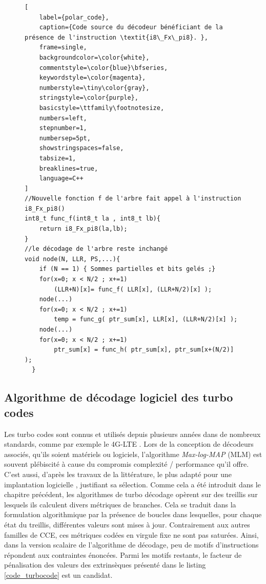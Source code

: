 \documentclass[../main.tex]{subfiles}
\begin{document}
\begin{figure}[!tb]
\begin{lstlisting}[
    label={polar_code},
    caption={Code source du décodeur bénéficiant de la présence de l'instruction \textit{i8\_Fx\_pi8}. },
    frame=single,
    backgroundcolor=\color{white},  
    commentstyle=\color{blue}\bfseries,
    keywordstyle=\color{magenta},
    numberstyle=\tiny\color{gray},
    stringstyle=\color{purple},
    basicstyle=\ttfamily\footnotesize,
    numbers=left,
    stepnumber=1,
    numbersep=5pt,                 
    showstringspaces=false,
    tabsize=1,
    breaklines=true,
    language=C++
]
//Nouvelle fonction f de l'arbre fait appel à l'instruction i8_Fx_pi8()
int8_t func_f(int8_t la , int8_t lb){
    return i8_Fx_pi8(la,lb);
}
//le décodage de l'arbre reste inchangé
void node(N, LLR, PS,...){
    if (N == 1) { Sommes partielles et bits gelés ;}
    for(x=0; x < N/2 ; x+=1)
        (LLR+N)[x]= func_f( LLR[x], (LLR+N/2)[x] );
    node(...)
    for(x=0; x < N/2 ; x+=1)
        temp = func_g( ptr_sum[x], LLR[x], (LLR+N/2)[x] );
    node(...)
    for(x=0; x < N/2 ; x+=1)
        ptr_sum[x] = func_h( ptr_sum[x], ptr_sum[x+(N/2)] );
  }
\end{lstlisting}
\end{figure}

%
%
%
%
%
%
%
%
\subsection{Algorithme de décodage logiciel des turbo codes}
%
%
%
%
Les turbo codes \cite{Berrou93,Wei18} sont connus et utilisés depuis plusieurs années dans de nombreux standards, comme par exemple le 4G-LTE \cite{Ref_4G}. Lors de la conception de décodeurs associés, qu'ils soient matériels ou logiciels, l'algorithme \textit{Max-log-MAP} (MLM) est souvent plébiscité à cause du compromis complexité / performance qu'il offre. C'est aussi, d'après les travaux de la littérature, le plus adapté pour une implantation logicielle \cite{ri:LeG19c}, justifiant sa sélection. Comme cela a été introduit dans le chapitre précédent, les algorithmes de turbo décodage opèrent sur des treillis sur lesquels ils calculent divers métriques de branches. Cela se traduit dans la formulation algorithmique par la présence de boucles dans lesquelles, pour chaque état du treillis, différentes valeurs sont mises à jour. Contrairement aux autres familles de CCE, ces métriques codées en virgule fixe ne sont pas saturées. 
Ainsi, dans la version scalaire de l'algorithme de décodage, peu de motifs d'instructions répondent aux contraintes énoncées. Parmi les motifs restants, le facteur de pénalisation des valeurs des extrinsèques présenté dans le listing \ref{code_turbocode} est un candidat.
\end{document}

